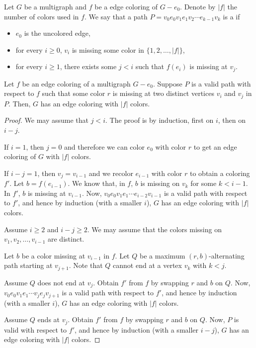 Let \(G\) be a multigraph and \(f\) be a edge coloring of \(G - e_0\).
Denote by \(|f|\) the number of colors used in \(f\).
We say that a path \(P = v_0e_0v_1e_1v_2\cdots e_{k-1}v_k\) is a  if
\begin{itemize}
    \item \(e_0\) is the uncolored edge,
    \item for every \(i \geq 0\), \(v_i\) is missing some color in \(\{1, 2, \ldots, |f|\}\),
    \item for every \(i \geq 1\), there exists some \(j < i\) such that \(f(e_i)\) is missing at \(v_j\).
\end{itemize}

\begin{lemma}[Kierstead] \label{lem:kierstead}
    Let \(f\) be an edge coloring of a multigraph \(G - e_0\).
    Suppose \(P\) is a valid path with respect to \(f\)
    such that some color \(r\) is missing at two distinct vertices
    \(v_i\) and \(v_j\) in \(P\).
    Then, \(G\) has an edge coloring with \(|f|\) colors.
\end{lemma}

\begin{proof}
    We may assume that \(j < i\).
    The proof is by induction, first on \(i\), then on \(i-j\).

    If \(i = 1\), then \(j = 0\) and therefore we can color \(e_0\) with color \(r\) to get an edge coloring of \(G\) with \(|f|\) colors.

    If \(i-j = 1\), then \(v_j = v_{i-1}\) and we recolor \(e_{i-1}\) with color \(r\)
    to obtain a coloring \(f'\).
    Let \(b = f(e_{i-1})\).
    We know that, in \(f\), \(b\) is missing on \(v_k\) for some \(k < i-1\).
    In \(f'\), \(b\) is missing at \(v_{i-1}\).
    Now, \(v_0e_0v_1e_1\cdots e_{i-2}v_{i-1}\) is a valid path with respect to \(f'\),
    and hence by induction (with a smaller \(i\)), \(G\) has an edge coloring with \(|f|\) colors.

        Assume \(i \geq 2\) and \(i-j \geq 2\).
    We may assume that the colors missing on \(v_1, v_2, \ldots, v_{i-1}\) are distinct.

    Let \(b\) be a color missing at \(v_{i-1}\) in \(f\).
    Let \(Q\) be a maximum \((r, b)\)-alternating path starting at \(v_{j+1}\).
    Note that \(Q\) cannot end at a vertex \(v_k\) with \(k < j\).

    Assume \(Q\) does not end at \(v_j\).
    Obtain \(f'\) from \(f\) by swapping \(r\) and \(b\) on \(Q\).
    Now, \(v_0e_0v_1e_1\cdots v_je_jv_{j+1}\) is a valid path with respect to \(f'\),
    and hence by induction (with a smaller \(i\)), \(G\) has an edge coloring with \(|f|\) colors.

    Assume \(Q\) ends at \(v_j\).
    Obtain \(f'\) from \(f\) by swapping \(r\) and \(b\) on \(Q\).
    Now, \(P\) is valid with respect to \(f'\),
    and hence by induction (with a smaller \(i-j\)), \(G\) has an edge coloring with \(|f|\) colors.
\end{proof}

